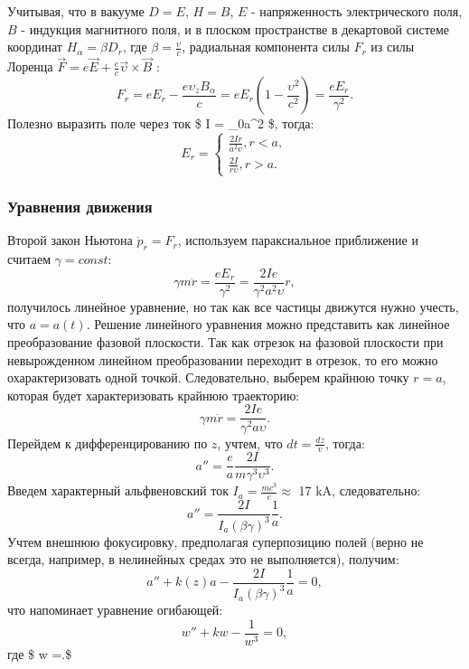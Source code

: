 \documentclass[11pt]{article}
\begin{document}
    Учитывая, что в вакууме \(D = E\), \(H = B\), \(E\) - напряженность
электрического поля, \(B\) - индукция магнитного поля, и в плоском
пространстве в декартовой системе координат \(H_\alpha = \beta D_r\),
где \(\displaystyle\beta = \frac{\upsilon}{c}\), радиальная компонента
силы \(F_r\) из силы Лоренца
\(\vec{F} = e\vec{E} + \displaystyle\frac{e}{c}\vec{\upsilon}\times\vec{B}\)
: \[
F_r = eE_r - \frac{e\upsilon_z B_\alpha}{c} = eE_r(1-\displaystyle \frac{\upsilon^2}{c^2}) = \displaystyle \frac{eE_r}{\gamma^2}.
\] Полезно выразить поле через ток \$ I = \rho\_0\upsilon\pi a\^{}2 \$,
тогда: \[
E_r = 
\begin{equation*}
 \begin{cases}
   \displaystyle \frac{2 I r}{a^2\upsilon}, r < a, 
   \\
   \displaystyle \frac{2 I}{r\upsilon}, r > a.
 \end{cases}
\end{equation*}
\]

    \hypertarget{ux443ux440ux430ux432ux43dux435ux43dux438ux44f-ux434ux432ux438ux436ux435ux43dux438ux44f}{%
\subsubsection{Уравнения
движения}\label{ux443ux440ux430ux432ux43dux435ux43dux438ux44f-ux434ux432ux438ux436ux435ux43dux438ux44f}}

    Второй закон Ньютона \(\dot p_r = F_r\), используем параксиальное
приближение и считаем \(\gamma = const\): \[
\gamma m \ddot r = \displaystyle \frac{eE_r}{\gamma^2} = \displaystyle \frac{2 I e}{\gamma^2 a^2 \upsilon} r, 
\] получилось линейное уравнение, но так как все частицы движутся нужно
учесть, что \(a = a(t)\). Решение линейного уравнения можно представить
как линейное преобразование фазовой плоскости. Так как отрезок на
фазовой плоскости при невырожденном линейном преобразовании переходит в
отрезок, то его можно охарактеризовать одной точкой. Следовательно,
выберем крайнюю точку \(r = a\), которая будет характеризовать крайнюю
траекторию: \[
\gamma m \ddot r = \displaystyle \frac{2 I e}{\gamma^2 a \upsilon}. 
\] Перейдем к дифференцированию по \(z\), учтем, что
\(\displaystyle dt = \frac{dz}{v}\), тогда: \[
a'' = \displaystyle \frac{e}{a}\frac{2I}{m\gamma^3\upsilon^3}.
\] Введем характерный альфвеновский ток
\(I_a = \displaystyle \frac{mc^3}{e} \approx\) 17 kA, следовательно: \[
a'' = \displaystyle \frac{2I}{I_a (\beta\gamma)^3} \frac{1}{a}.
\] Учтем внешнюю фокусировку, предполагая суперпозицию полей (верно не
всегда, например, в нелинейных средах это не выполняется), получим: \[
a'' + k(z)a - \displaystyle \frac{2I}{I_a (\beta\gamma)^3} \frac{1}{a} = 0,
\] что напоминает уравнение огибающей:
\[ w'' + kw - \displaystyle \frac{1}{w^3} = 0 ,\] где \$ w
=\displaystyle  \sqrt \beta .\$
\end{document}
